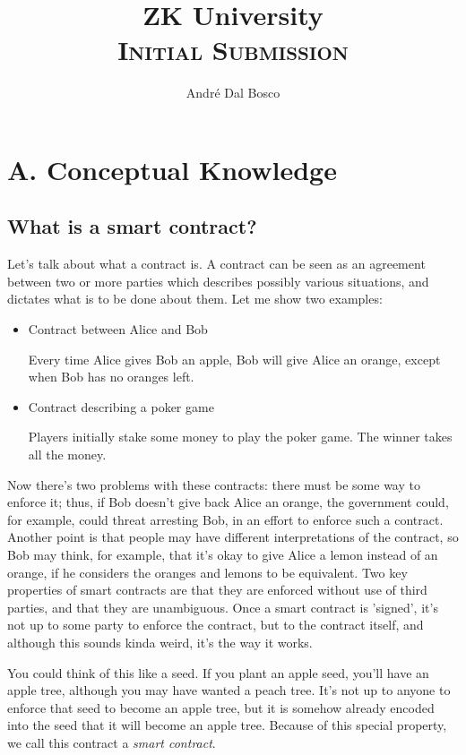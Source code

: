 \documentclass{article}
\title{ZK University \\[4pt] \normalsize\textsc{Initial Submission}}
\author{André Dal Bosco}
\begin{document}
\maketitle

\section*{A. Conceptual Knowledge}

\subsection*{What is a smart contract?}

Let's talk about what a contract is. A contract can be seen as an agreement between two or more parties which describes possibly various situations, and dictates what is to be done about them. Let me show two examples:
\begin{itemize}
    \item Contract between Alice and Bob

    Every time Alice gives Bob an apple, Bob will give Alice an orange, except when Bob has no oranges left.
    
    \item Contract describing a poker game
    
    Players initially stake some money to play the poker game. The winner takes all the money.
\end{itemize}
        
Now there's two problems with these contracts: there must be some way to enforce it; thus, if Bob doesn't give back Alice an orange, the government could, for example, could threat arresting Bob, in an effort to enforce such a contract. Another point is that people may have different interpretations of the contract, so Bob may think, for example, that it's okay to give Alice a lemon instead of an orange, if he considers the oranges and lemons to be equivalent. Two key properties of smart contracts are that they are enforced without use of third parties, and that they are unambiguous. Once a smart contract is 'signed', it's not up to some party to enforce the contract, but to the contract itself, and although this sounds kinda weird, it's the way it works.

You could think of this like a seed. If you plant an apple seed, you'll have an apple tree, although you may have wanted a peach tree. It's not up to anyone to enforce that seed to become an apple tree, but it is somehow already encoded into the seed that it will become an apple tree. Because of this special property, we call this contract a \emph{smart contract}.
\end{document}
